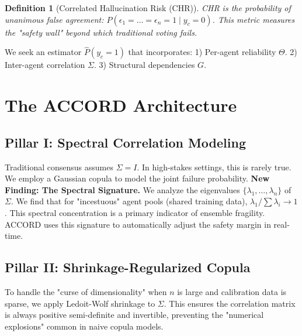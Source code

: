 \documentclass[conference]{IEEEtran}
\newtheorem{definition}{Definition}
\begin{document}
\begin{definition}[Correlated Hallucination Risk (CHR)]
CHR is the probability of unanimous false agreement: $P(\epsilon_1 = \dots = \epsilon_n = 1 \mid y_c = 0)$. This metric measures the "safety wall" beyond which traditional voting fails.
\end{definition}

We seek an estimator $\hat{P}(y_c = 1)$ that incorporates:
1) Per-agent reliability $\Theta$.
2) Inter-agent correlation $\Sigma$.
3) Structural dependencies $G$.

\section{The ACCORD Architecture}
\label{sec:framework}

\subsection{Pillar I: Spectral Correlation Modeling}
Traditional consensus assumes $\Sigma = I$. In high-stakes settings, this is rarely true. We employ a Gaussian copula to model the joint failure probability. 
\textbf{New Finding: The Spectral Signature.} We analyze the eigenvalues $\{\lambda_1, \dots, \lambda_n\}$ of $\Sigma$. We find that for "incestuous" agent pools (shared training data), $\lambda_1 / \sum \lambda_i \to 1$. This spectral concentration is a primary indicator of ensemble fragility. ACCORD uses this signature to automatically adjust the safety margin in real-time.

\subsection{Pillar II: Shrinkage-Regularized Copula}
To handle the "curse of dimensionality" when $n$ is large and calibration data is sparse, we apply Ledoit-Wolf shrinkage to $\Sigma$. This ensures the correlation matrix is always positive semi-definite and invertible, preventing the "numerical explosions" common in naive copula models.
\end{document}
